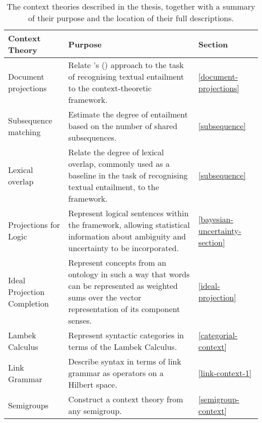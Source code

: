 \begin{table}
\begin{center}
\begin{tabular}{|l|p{6cm}|l|}
\hline
\textbf{Context Theory} & \textbf{Purpose} & \textbf{Section}\\
\hline\hline
Document projections & Relate \citeauthor{Glickman:05}'s (\citeyear{Glickman:05}) approach to the task of recognising textual  entailment to the context-theoretic framework. &\ref{document-projections}\\
\hline
Subsequence matching & Estimate the degree of entailment based on the number of shared subsequences. & \ref{subsequence}\\
\hline
Lexical overlap & Relate the degree of lexical overlap, commonly used as a baseline in the task of recognising textual entailment, to the framework. & \ref{subsequence}\\
\hline
Projections for Logic & Represent logical sentences within the framework, allowing statistical information about ambiguity and uncertainty to be incorporated. & \ref{bayesian-uncertainty-section}\\
\hline
Ideal Projection Completion & Represent concepts from an ontology in such a way that words can be represented as weighted sums over the vector representation of its component senses. & \ref{ideal-projection}\\
\hline
Lambek Calculus & Represent syntactic categories in terms of the Lambek Calculus. & \ref{categorial-context}\\
\hline
Link Grammar & Describe syntax in terms of link grammar as operators on a Hilbert space. & \ref{link-context-1}\\
\hline
Semigroups & Construct a context theory from any semigroup. & \ref{semigroup-context}\\
\hline
\end{tabular}
\caption{The context theories described in the thesis, together with a summary of their purpose and the location of their full descriptions.}
\label{context-theories-table}
\end{center}
\end{table}

